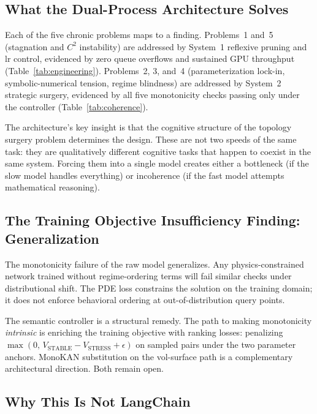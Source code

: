 \documentclass[11pt,a4paper]{article}
\begin{document}
\subsection{What the Dual-Process Architecture Solves}
\label{sec:discussion:solves}

Each of the five chronic problems maps to a finding. Problems~1 and~5 (stagnation
and $C^2$ instability) are addressed by System~1 reflexive pruning and lr control,
evidenced by zero queue overflows and sustained GPU throughput (Table~\ref{tab:engineering}).
Problems~2, 3, and~4 (parameterization lock-in, symbolic-numerical tension, regime
blindness) are addressed by System~2 strategic surgery, evidenced by all five
monotonicity checks passing only under the controller (Table~\ref{tab:coherence}).

The architecture's key insight is that the cognitive structure of the topology surgery
problem determines the design. These are not two speeds of the same task: they are
qualitatively different cognitive tasks that happen to coexist in the same system.
Forcing them into a single model creates either a bottleneck (if the slow model
handles everything) or incoherence (if the fast model attempts mathematical reasoning).

\subsection{The Training Objective Insufficiency Finding: Generalization}
\label{sec:discussion:generalization}

The monotonicity failure of the raw model generalizes. Any physics-constrained network
trained without regime-ordering terms will fail similar checks under distributional
shift. The PDE loss constrains the solution on the training domain; it does not
enforce behavioral ordering at out-of-distribution query points.

The semantic controller is a structural remedy. The path to making monotonicity
\emph{intrinsic} is enriching the training objective with ranking losses: penalizing
$\max(0,\, V_\text{STABLE} - V_\text{STRESS} + \epsilon)$ on sampled pairs under
the two parameter anchors. MonoKAN \citep{polo_molina_etal_2024_monokan} substitution
on the vol-surface path is a complementary architectural direction. Both remain open.

\subsection{Why This Is Not LangChain}
\label{sec:discussion:notlangchain}
\end{document}

